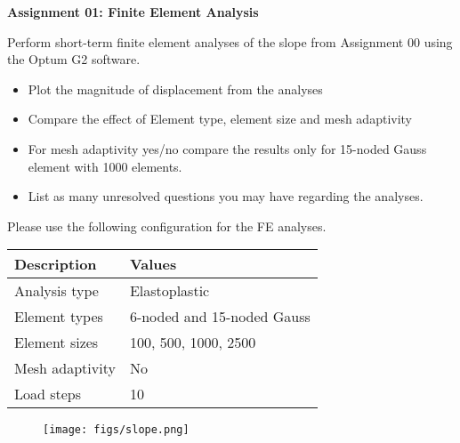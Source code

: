\documentclass[a4paper,12pt]{article}
\begin{document}
\begin{centering}
	\textbf{
		Assignment 01: Finite Element Analysis\\
	}
\end{centering}

\vspace{1em}
 
Perform short-term finite element analyses of the slope from Assignment 00 using the Optum G2 software. 

\begin{itemize}
	\item Plot the magnitude of displacement from the analyses
	\item Compare the effect of Element type, element size and mesh adaptivity
	\item For mesh adaptivity yes/no compare the results only for 15-noded Gauss element with 1000 elements.
	\item List as many unresolved questions you may have regarding the analyses.
\end{itemize}

Please use the following configuration for the FE analyses. 

\begin{table}[!h]
	\centering
	\begin{tabular}{ll}
		\toprule
		\textbf{Description}     & \textbf{Values} \\
		\midrule
		Analysis type & Elastoplastic\\
		Element types  &   6-noded and 15-noded Gauss\\
		Element sizes   & 100, 500, 1000, 2500    \\
		Mesh adaptivity & No\\
		Load steps & 10 \\
		\bottomrule
	\end{tabular}
\end{table}

\begin{figure}[!h]
	\centering
	\texttt{[image: figs/slope.png]}
\end{figure}


	
\end{document}
